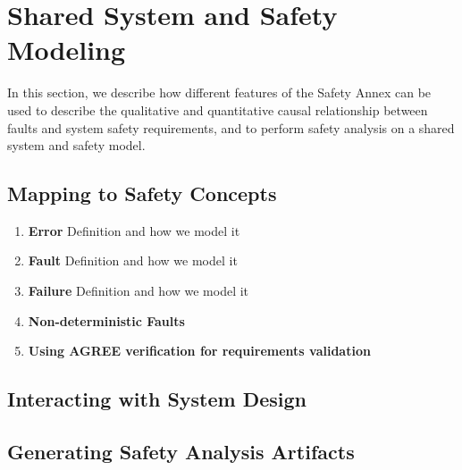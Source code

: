 \section{Shared System and Safety Modeling}
\label{sec:safety_modeling}

In this section, we describe how different features of the Safety Annex can be used to describe the qualitative and quantitative causal relationship between faults and system safety requirements, and to perform safety analysis on a shared system and safety model.

\subsection{Mapping to Safety Concepts}

\begin{enumerate}
	\item \textbf{Error} Definition and how we model it
	\item \textbf{Fault} Definition and how we model it
	\item \textbf{Failure} Definition and how we model it
	\item \textbf{Non-deterministic Faults}
	\item \textbf{Using AGREE verification for requirements validation}
\end{enumerate}

\begin{comment}
Errors/Faults/Failures - to a safety engineer, these terms have very specific meanings.  You will see my specific comments on this topic where I located them by your Section 3.3.  If needed, we can talk about this comment after I send you my mark-ups.
In Section 3.1, you introduce the term "non-deterministic".  I am not sure how your new process can be used by the safety engineering discipline unless things are "deterministic" and therefore "repeatable".
\end{comment}

\subsection{Interacting with System Design}

\begin{comment}
This paper should define how your team of authors see the interaction between "functions" and "system".  
Here is how I see the interaction / relationship:
(a) Aircraft Functions are the highest level
(b) Aircraft Functions are comprised of one or more System
(c) Each System performs one or more System Function
(d) Each System is comprised of one or more LRUs (a.k.a. "items")
\end{comment}

\subsection{Generating Safety Analysis Artifacts}